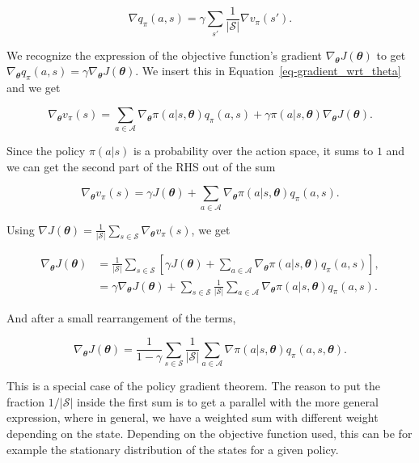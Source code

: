 \documentclass[
  letterpaper,
]{report}
\theoremstyle{definition}
\theoremstyle{plain}
\theoremstyle{definition}
\theoremstyle{remark}
\begin{document}
\[
\nabla q_\pi(a,s) =  \gamma\sum_{s'}\frac{1}{|\mathcal{S}|}\nabla v_\pi(s').
\]

We recognize the expression of the objective function's gradient
\(\nabla_{\mathbfit{\theta}} J({\mathbfit{\theta}})\) to get
\(\nabla_{\mathbfit{\theta}} q_\pi(a,s) = \gamma \nabla_{\mathbfit{\theta}} J({\mathbfit{\theta}})\).
We insert this in Equation~\ref{eq-gradient_wrt_theta} and we get

\[
\nabla_{\mathbfit{\theta}} v_\pi(s) = \sum_{a\in\mathcal{A}}\nabla_{\mathbfit{\theta}}\pi(a|s, {\mathbfit{\theta}})q_\pi(a,s) + \gamma\pi(a|s, {\mathbfit{\theta}})\nabla_{\mathbfit{\theta}} J({\mathbfit{\theta}}).
\]

Since the policy \(\pi(a|s)\) is a probability over the action space, it
sums to \(1\) and we can get the second part of the RHS out of the sum

\[
\nabla_{\mathbfit{\theta}} v_\pi(s) = \gamma J({\mathbfit{\theta}}) + \sum_{a\in\mathcal{A}}\nabla_{\mathbfit{\theta}}\pi(a|s,{\mathbfit{\theta}})q_\pi(a,s).
\]

Using
\(\nabla J({\mathbfit{\theta}}) = \frac{1}{|\mathcal{S}|}\sum_{s\in\mathcal{S}}\nabla_{\mathbfit{\theta}} v_\pi(s)\),
we get

\begin{align}
\nabla_{\mathbfit{\theta}} J({\mathbfit{\theta}}) &= \frac{1}{|\mathcal{S}|}\sum_{s\in\mathcal{S}}\left[\gamma J({\mathbfit{\theta}}) + \sum_{a\in\mathcal{A}}\nabla_{\mathbfit{\theta}}\pi(a|s, {\mathbfit{\theta}})q_\pi(a,s)\right],\\
&= \gamma \nabla_{\mathbfit{\theta}} J({\mathbfit{\theta}}) + \sum_{s\in\mathcal{S}}\frac{1}{|\mathcal{S}|}\sum_{a\in\mathcal{A}}\nabla_{\mathbfit{\theta}}\pi(a|s, {\mathbfit{\theta}})q_\pi(a,s).
\end{align}

And after a small rearrangement of the terms,

\[
\nabla_{\mathbfit{\theta}} J(\mathbfit{\theta}) = \frac{1}{1-\gamma}\sum_{s\in \mathcal{S}}\frac{1}{|\mathcal{S}|}\sum_{a\in\mathcal{A}}\nabla\pi(a|s,{\mathbfit{\theta}})q_\pi(a,s,{\mathbfit{\theta}}).
\]

This is a special case of the policy gradient theorem. The reason to put
the fraction \(1/|\mathcal{S}|\) inside the first sum is to get a
parallel with the more general expression, where in general, we have a
weighted sum with different weight depending on the state. Depending on
the objective function used, this can be for example the stationary
distribution of the states for a given policy.
\end{document}
